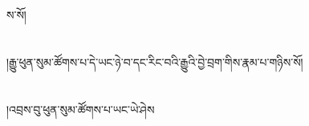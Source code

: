 ས་སོ།\chapter{ }།རྒྱུ་ཕུན་སུམ་ཚོགས་པ་དེ་ཡང་ཉེ་བ་དང་རིང་བའི་རྒྱུའི་བྱེ་བྲག་གིས་རྣམ་པ་གཉིས་སོ།\chapter{ }།འབྲས་བུ་ཕུན་སུམ་ཚོགས་པ་ཡང་ཡེ་ཤེས